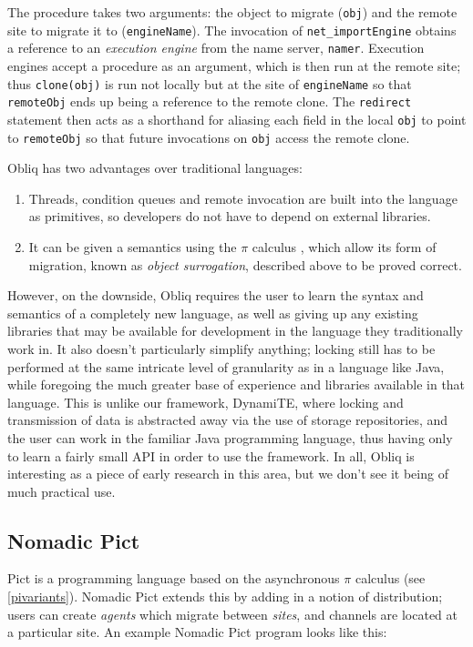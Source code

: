 The procedure takes two arguments: the object to migrate
(\texttt{obj}) and the remote site to migrate it to
(\texttt{engineName}).  The invocation of \texttt{net\_importEngine}
obtains a reference to an \emph{execution engine} from the name
server, \texttt{namer}.  Execution engines accept a procedure as an
argument, which is then run at the remote site; thus
\texttt{clone(obj)} is run not locally but at the site of
\texttt{engineName} so that \texttt{remoteObj} ends up being a
reference to the remote clone.  The \texttt{redirect} statement then
acts as a shorthand for aliasing each field in the local \texttt{obj}
to point to \texttt{remoteObj} so that future invocations on
\texttt{obj} access the remote clone.

Obliq has two advantages over traditional languages:

\begin{enumerate}
\item Threads, condition queues and remote invocation are built into
  the language as primitives, so developers do not have to depend on
  external libraries.
\item It can be given a semantics using the $\pi$ calculus
  \cite{obliqsem}, which allow its form of migration, known as
  \emph{object surrogation}, described above to be proved correct.
\end{enumerate}

However, on the downside, Obliq requires the user to learn the syntax
and semantics of a completely new language, as well as giving up any
existing libraries that may be available for development in the
language they traditionally work in.  It also doesn't particularly
simplify anything; locking still has to be performed at the same
intricate level of granularity as in a language like Java, while
foregoing the much greater base of experience and libraries available
in that language.  This is unlike our framework, DynamiTE, where
locking and transmission of data is abstracted away via the use of
storage repositories, and the user can work in the familiar Java
programming language, thus having only to learn a fairly small API in
order to use the framework.  In all, Obliq is interesting as a piece
of early research in this area, but we don't see it being of much
practical use.

\subsection{Nomadic Pict}

Pict is a programming language based on the asynchronous $\pi$
calculus (see \ref{pivariants}).  Nomadic Pict extends this by adding
in a notion of distribution; users can create \emph{agents} which
migrate between \emph{sites}, and channels are located at a particular
site.  An example Nomadic Pict program looks like this:

